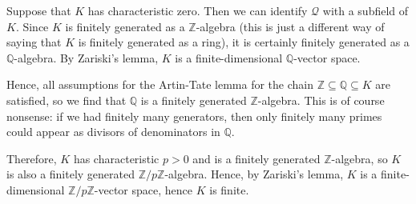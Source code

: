 Suppose that $K$ has characteristic zero. Then we can identify $\mathcal{Q}$ with
a subfield of $K$. Since $K$ is finitely generated as a $\mathbb{Z}$-algebra (this
is just a different way of saying that $K$ is finitely generated as a ring), it
is certainly finitely generated as a $\mathbb{Q}$-algebra. By Zariski's lemma,
$K$ is a finite-dimensional $\mathbb{Q}$-vector space.

Hence, all assumptions
for the Artin-Tate lemma for the chain $\mathbb{Z} \subseteq \mathbb{Q} \subseteq K$
are satisfied, so we find that $\mathbb{Q}$ is a finitely generated $\mathbb{Z}$-algebra.
This is of course nonsense: if we had finitely many generators, then only finitely
many primes could appear as divisors of denominators in $\mathbb{Q}$.

Therefore, $K$ has characteristic $p > 0$ and is a finitely generated $\mathbb{Z}$-algebra,
so $K$ is also a finitely generated $\mathbb{Z}/p\mathbb{Z}$-algebra. Hence, by
Zariski's lemma, $K$ is a finite-dimensional $\mathbb{Z}/p\mathbb{Z}$-vector space,
hence $K$ is finite.
